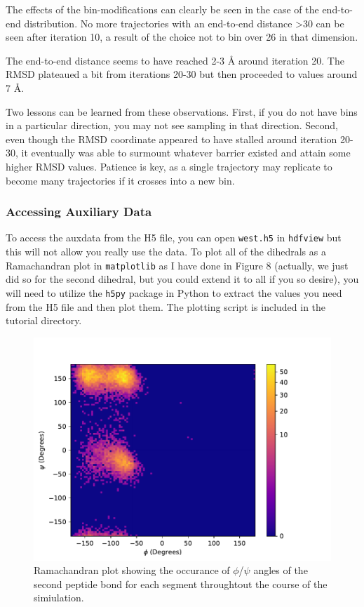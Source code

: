 \documentclass[9pt,tutorial]{livecoms}
\begin{document}
The effects of the bin-modifications can clearly be seen in the case of the end-to-end distribution. 
No more trajectories with an end-to-end distance >30 can be seen after iteration 10, a result of the choice not to bin over 26 in that dimension.

The end-to-end distance seems to have reached 2-3 \AA{} around iteration 20. 
The RMSD plateaued a bit from iterations 20-30 but then proceeded to values around 7 \AA.  

Two lessons can be learned from these observations. 
First, if you do not have bins in a particular direction, you may not see sampling in that direction. 
Second, even though the RMSD coordinate appeared to have stalled around iteration 20-30, it eventually was able to surmount whatever barrier existed and attain some higher RMSD values. 
Patience is key, as a single trajectory may replicate to become many trajectories if it crosses into a new bin.

\subsubsection{Accessing Auxiliary Data}

To access the auxdata from the H5 file, you can open \verb|west.h5| in \verb|hdfview| but this will not allow you really use the data. 
To plot all of the dihedrals as a Ramachandran plot in \verb|matplotlib| as I have done in Figure 8 (actually, we just did so for the second dihedral, but you could extend it to all if you so desire), you will need to utilize the \verb|h5py| package in Python to extract the values you need from the H5 file and then plot them. 
The plotting script is included in the tutorial directory.

\begin{figure}
\includegraphics[width=\linewidth]{Figure8.pdf}
\caption{Ramachandran plot showing the occurance of $\phi$/$\psi$ angles of the second peptide bond for each segment throughtout the course of the simiulation.}
\label{fig:view}
\end{figure}
\end{document}
